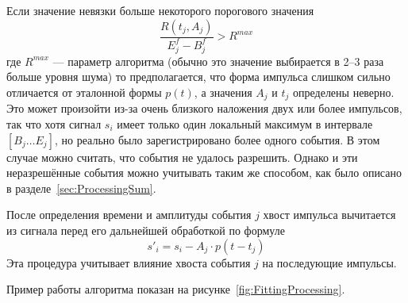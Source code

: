 

Если значение невязки больше некоторого порогового значения 
\begin{equation*}
  \frac{ R(t_j,A_j) }{ E_j^f - B_j^f } > R^{max}
\end{equation*}
где $R^{max}$ --- параметр алгоритма (обычно это значение выбирается в 2--3 раза больше уровня шума) то предполагается, что форма импульса слишком сильно отличается от эталонной формы $p(t)$, а значения $A_j$ и $t_j$ определены неверно. Это может произойти из-за очень близкого наложения двух или более импульсов, так что хотя сигнал $s_i$ имеет только один локальный максимум в интервале $\left[ B_j \ldots E_j \right] $, но реально было зарегистрировано более одного события. В этом случае можно считать, что события не удалось разрешить. Однако и эти неразрешённые события можно учитывать таким же способом, как было описано в разделе~\ref{sec:ProcessingSum}.

После определения времени и амплитуды события $j$ хвост импульса вычитается из сигнала перед его дальнейшей обработкой по формуле
\begin{equation*}
  s'_i = s_i - A_j \cdot p( t - t_j )
\end{equation*}
Эта процедура учитывает влияние хвоста события $j$ на последующие импульсы.

Пример работы алгоритма показан на рисунке~\ref{fig:FittingProcessing}.

